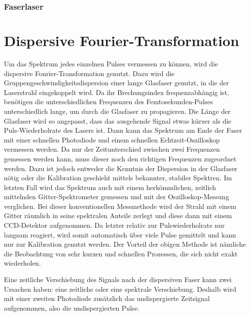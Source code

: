 \documentclass[bachelor,       %
               twoside,        %
               BCOR10mm,       %
               liststotoc,nomtotoc,bibtotoc, %
               english,ngerman, %
               final,          %
               ]{GAUBM}
\begin{document}
\subsubsection{Faserlaser}

\cite{ortac_observation_2010}
\cite{zaviyalov_impact_2012}
\cite{zavyalov_dissipative_2009}
\cite{zavyalov_discrete_2009}

\cite{grelu_multisoliton_2004}
\cite{grelu_nonlinear_2007}
\cite{grapinet_vibrating_2006}

\cite{grelu_group_2004}
\cite{rohrmann_two-soliton_2013}

\section{Dispersive Fourier-Transformation}
\cite{goda_dispersive_2013}

Um das Spektrum jedes einzelnen Pulses vermessen zu können, wird die dispersive Fourier-Transformation genutzt.
Dazu wird die Gruppengeschwindigkeitsdispersion einer lange Glasfaser genutzt, in die der Laserstrahl eingekoppelt wird.
Da ihr Brechungsindex frequenzabhängig ist, benötigen die unterschiedlichen Frequenzen des Femtosekunden-Pulses unterschiedlich lange, um durch die Glasfaser zu propagieren.
Die Länge der Glasfaser wird so angepasst, dass das ausgehende Signal etwas kürzer als die Puls-Wiederholrate des Lasers ist.
Dann kann das Spektrum am Ende der Faser mit einer schnellen Photodiode und einem schnellen Echtzeit-Oszilloskop vermessen werden.
Da nur der Zeitunterschied zwischen zwei Frequenzen gemessen werden kann, muss dieser noch den richtigen Frequenzen zugeordnet werden.
Dazu ist jedoch entweder die Kenntnis der Dispersion in der Glasfaser nötig oder die Kalibration geschieht mittels bekannter, stabiler Spektren.
Im letzten Fall wird das Spektrum auch mit einem herkömmlichen, zeitlich mittelnden Gitter-Spektrometer gemessen und mit der Oszilloskop-Messung verglichen.
Bei dieser konventionellen Messmethode wird der Strahl mit einem Gitter räumlich in seine spektralen Anteile zerlegt und diese dann mit einem CCD-Detektor aufgenommen.
Da letzter relativ zur Pulswiederholrate nur langsam reagiert, wird somit automatisch über viele Pulse gemittelt und kann nur zur Kalibration genutzt werden.
Der Vorteil der obigen Methode ist nämliche die Beobachtung von sehr kurzen und schnellen Prozessen, die sich nicht exakt wiederholen.

Eine zeitliche Verschiebung des Signals nach der dispersiven Faser kann zwei Ursachen haben: eine zeitliche oder eine spektrale Verschiebung.
Deshalb wird mit einer zweiten Photodiode zusätzlich das undispergierte Zeitsignal aufgenommen, also die undispergierten Pulse.
\end{document}
